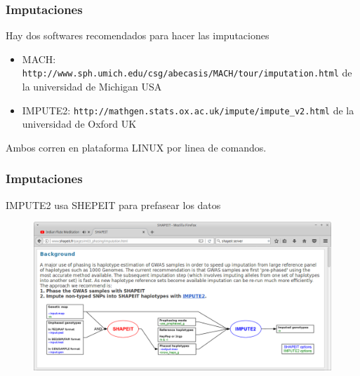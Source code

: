 \documentclass{beamer}\usepackage[]{graphicx}\usepackage[]{color}
\begin{document}
\begin{frame}[fragile]
\frametitle{Imputaciones}

Hay dos softwares recomendados para hacer las imputaciones

\begin{itemize}
\item MACH: {\scriptsize {\tt http://www.sph.umich.edu/csg/abecasis/MACH/tour/imputation.html}}
de la universidad de Michigan USA
\item IMPUTE2: {\tt http://mathgen.stats.ox.ac.uk/impute/impute\_v2.html}
de la universidad de Oxford UK
\end{itemize}

Ambos corren en plataforma LINUX por linea de comandos. 
\end{frame}


\begin{frame}[fragile]
\frametitle{Imputaciones}
IMPUTE2 usa SHEPEIT para prefasear los datos

\begin{figure}[htbp]
\begin{center}
\includegraphics[width=.9\linewidth]{impute.png}
\end{center}
\end{figure}

\end{frame}
\end{document}
